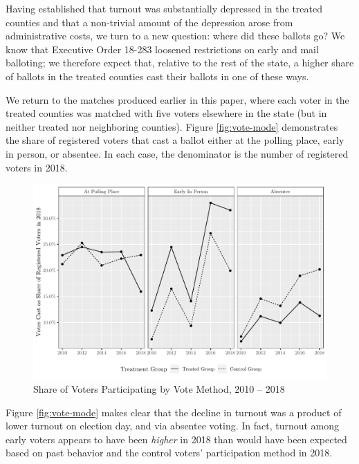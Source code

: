 \documentclass[
  12pt,
]{article}
\begin{document}
Having established that turnout was substantially depressed in the treated counties and that a non-trivial amount of the depression arose from administrative costs, we turn to a new question: where did these ballots go? We know that Executive Order 18-283 loosened restrictions on early and mail balloting; we therefore expect that, relative to the rest of the state, a higher share of ballots in the treated counties cast their ballots in one of these ways.

We return to the matches produced earlier in this paper, where each voter in the treated counties was matched with five voters elsewhere in the state (but in neither treated nor neighboring counties). Figure \ref{fig:vote-mode} demonstrates the share of registered voters that cast a ballot either at the polling place, early in person, or absentee. In each case, the denominator is the number of registered voters in 2018.

\begin{figure}[H]

{\centering \includegraphics{hurricane_michael_files/figure-latex/vote-mode-chunk-1} 

}

\caption{\label{fig:vote-mode}Share of Voters Participating by Vote Method, 2010 -- 2018}\label{fig:vote-mode-chunk}
\end{figure}

Figure \ref{fig:vote-mode} makes clear that the decline in turnout was a product of lower turnout on election day, and via absentee voting. In fact, turnout among early voters appears to have been \emph{higher} in 2018 than would have been expected based on past behavior and the control voters' participation method in 2018.
\end{document}

